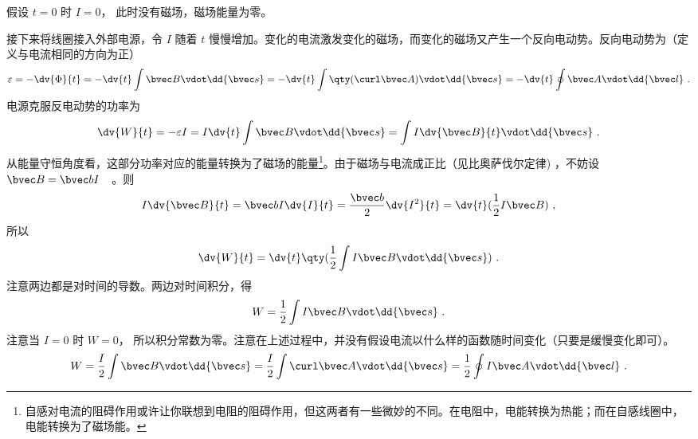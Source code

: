 假设 $t = 0$ 时 $I = 0$， 此时没有磁场，磁场能量为零。

接下来将线圈接入外部电源，令 $I$ 随着 $t$ 慢慢增加。变化的电流激发变化的磁场，而变化的磁场又产生一个反向电动势。反向电动势为（定义与电流相同的方向为正）
\begin{equation}\label{eq_BEng_2}
\varepsilon  =  - \dv{\Phi}{t} =  - \dv{t} \int \bvec B \vdot \dd{\bvec s} 
=  - \dv{t} \int \qty(\curl \bvec A) \vdot \dd{\bvec s} 
=  - \dv{t} \oint \bvec A \vdot \dd{\bvec l}~.
\end{equation}
电源克服反电动势的功率为
\begin{equation}\label{eq_BEng_3}
\dv{W}{t} =  - \varepsilon I = I\dv{t} \int \bvec B \vdot \dd{\bvec s} = \int I \dv{\bvec B}{t} \vdot \dd{\bvec s}~.
\end{equation}
从能量守恒角度看，这部分功率对应的能量转换为了磁场的能量\footnote{自感对电流的阻碍作用或许让你联想到电阻的阻碍作用，但这两者有一些微妙的不同。在电阻中，电能转换为热能；而在自感线圈中，电能转换为了磁场能。}。由于磁场与电流成正比（见比奥萨伐尔定律)
，不妨设 $\bvec B = \bvec bI$　。则
\begin{equation}\label{eq_BEng_4}
I \dv{\bvec B}{t} = \bvec bI \dv{I}{t} = \frac{\bvec b}{2} \dv{I^2}{t} = \dv{t} (\frac12 I\bvec B)~,
\end{equation}
所以
\begin{equation}\label{eq_BEng_5}
\dv{W}{t} = \dv{t} \qty(\frac12 \int I\bvec B \vdot \dd{\bvec s})~.
\end{equation}
注意两边都是对时间的导数。两边对时间积分，得
\begin{equation}\label{eq_BEng_6}
W = \frac12 \int I\bvec B \vdot \dd{\bvec s}~.
\end{equation}
注意当 $I = 0$ 时 $ W = 0$， 所以积分常数为零。注意在上述过程中，并没有假设电流以什么样的函数随时间变化（只要是缓慢变化即可）。
\begin{equation}\label{eq_BEng_7}
W = \frac{I}{2} \int \bvec B \vdot \dd{\bvec s}  = \frac{I}{2} \int \curl \bvec A \vdot \dd{\bvec s}  = \frac12 \oint I\bvec A \vdot \dd{\bvec l}~.
\end{equation}
 
